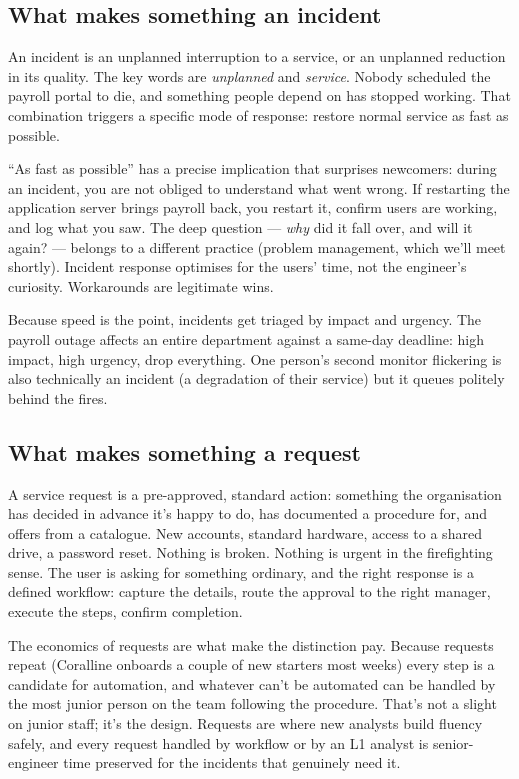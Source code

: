 \subsection{What makes something an incident}


An incident is an unplanned interruption to a service, or an unplanned reduction in its quality. The key words are \emph{unplanned} and \emph{service}. Nobody scheduled the payroll portal to die, and something people depend on has stopped working. That combination triggers a specific mode of response: restore normal service as fast as possible.


``As fast as possible'' has a precise implication that surprises newcomers: during an incident, you are not obliged to understand what went wrong. If restarting the application server brings payroll back, you restart it, confirm users are working, and log what you saw. The deep question — \emph{why} did it fall over, and will it again? — belongs to a different practice (problem management, which we'll meet shortly). Incident response optimises for the users' time, not the engineer's curiosity. Workarounds are legitimate wins.


Because speed is the point, incidents get triaged by impact and urgency. The payroll outage affects an entire department against a same-day deadline: high impact, high urgency, drop everything. One person's second monitor flickering is also technically an incident (a degradation of their service) but it queues politely behind the fires.



\subsection{What makes something a request}


A service request is a pre-approved, standard action: something the organisation has decided in advance it's happy to do, has documented a procedure for, and offers from a catalogue. New accounts, standard hardware, access to a shared drive, a password reset. Nothing is broken. Nothing is urgent in the firefighting sense. The user is asking for something ordinary, and the right response is a defined workflow: capture the details, route the approval to the right manager, execute the steps, confirm completion.


The economics of requests are what make the distinction pay. Because requests repeat (Coralline onboards a couple of new starters most weeks) every step is a candidate for automation, and whatever can't be automated can be handled by the most junior person on the team following the procedure. That's not a slight on junior staff; it's the design. Requests are where new analysts build fluency safely, and every request handled by workflow or by an L1 analyst is senior-engineer time preserved for the incidents that genuinely need it.


